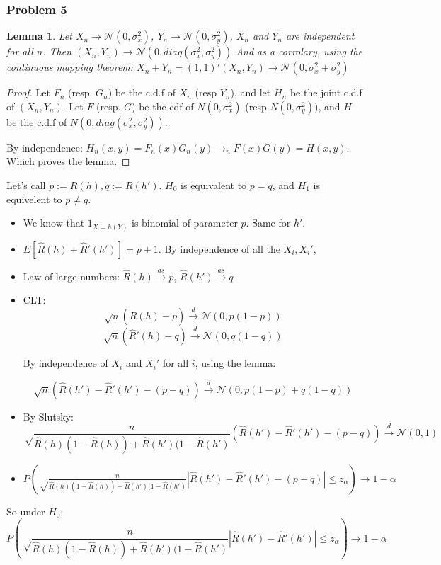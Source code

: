 \emph{}\documentclass[12pt]{article}
\newcommand{\Q}[1]{\subsubsection*{Problem #1}}
\newtheorem{lemma}[theorem]{Lemma}
\begin{document}
\Q{5}


\begin{lemma}
Let $X_n \rightarrow \mathcal N(0, \sigma_x^2)$, $Y_n \rightarrow \mathcal N(0, \sigma_y^2)$, $X_n$ and $Y_n$ are independent for all $n$.
Then $(X_n, Y_n) \rightarrow \mathcal N(0, diag(\sigma_x^2,\sigma_y^2) )$
And as a corrolary, using the continuous mapping theorem:
$X_n + Y_n  = (1, 1)' (X_n, Y_n) \rightarrow \mathcal N(0, \sigma_x^2 + \sigma_y^2 )$
\end{lemma}
\begin{proof}
Let $F_n$ (resp. $G_n$) be the c.d.f of $X_n$ (resp $Y_n$), and let $H_n$ be the joint c.d.f of $(X_n, Y_n)$.
Let $F$ (resp. $G$) be the cdf of $N(0, \sigma_x^2)$ (resp $N(0, \sigma_y^2)$), and $H$ be the c.d.f of $N(0, diag(\sigma_x^2,\sigma_y^2) )$.

By independence:
$H_n(x, y) = F_n(x) G_n(y) \rightarrow_n F(x)G(y) = H(x, y)$.
Which proves the lemma.
\end{proof}


\hfill \break
Let's call $p := R(h), q := R(h')$. $H_0$ is equivalent to $p = q$, and $H_1$ is equivelent to $p \ne q$.
\begin{itemize}
\item We know that $1_{X = h(Y)}$ is binomial of parameter $p$. Same for $h'$.
\item $E [\hat R(h) + \hat R'(h')] = p+1$. By independence of all the $X_i, X_i'$, 
\item Law of large numbers: $\hat R(h) \overset{as}{ \rightarrow } p$, $\hat R(h') \overset{as}{ \rightarrow } q$
\item CLT:
  $$\sqrt{n} (\hat R(h) - p) \overset{d}{ \rightarrow } \mathcal N(0, p(1-p)) $$
  $$\sqrt{n} (\hat R'(h) - q) \overset{d}{ \rightarrow } \mathcal N(0, q(1-q)) $$

  By independence of $X_i$ and $X_i'$ for all $i$, using the lemma:
  
$$\sqrt{n} (\hat R(h') - \hat R'(h') - (p-q) ) \overset{d}{ \rightarrow } \mathcal N(0, p(1-p) + q(1-q)) $$
\item By Slutsky:
  $$\sqrt \frac n {\hat R(h)(1-\hat R(h))+\hat R(h')(1-\hat R(h')} (\hat R(h') -  \hat R'(h') - (p-q)) \overset{d}{ \rightarrow } \mathcal N(0, 1)$$
\item $P(\sqrt \frac n {\hat R(h)(1-\hat R(h))+\hat R(h')(1-\hat R(h')} |\hat R(h') -\hat R'(h') - (p-q)| \le z_\alpha) \rightarrow 1 - \alpha$
\end{itemize}
So under $H_0$:
$$P(\sqrt \frac n {\hat R(h)(1-\hat R(h))+\hat R(h')(1-\hat R(h')} |\hat R(h') -\hat R'(h')| \le z_\alpha) \rightarrow 1 - \alpha$$
\end{document}
